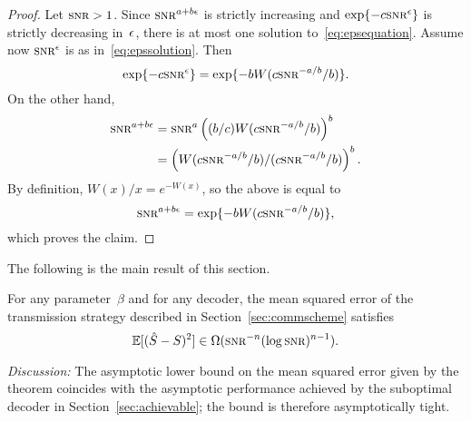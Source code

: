 \begin{proof}
  Let $\snr>1$. Since $\snr^{a+b\e}$ is strictly increasing and
  $\exp\{-c \snr^\e\}$ is strictly decreasing in~$\epsilon$, there is at most one
  solution to~\eqref{eq:epsequation}.  Assume now $\snr^\e$ is as
  in~\eqref{eq:epssolution}. Then
  \begin{equation*}
    \exp\{-c \snr^\e\} = \exp\{-b W(c \snr^{-a/b}/b)\}.
  \end{equation*}
  On the other hand,
  \begin{align*}
    \snr^{a+b\e} &= \snr^a \left( (b/c) W(c\snr^{-a/b}/b) \right)^b \\
    &= \left( W(c\snr^{-a/b}/b) / (c\snr^{-a/b}/b) \right)^b.
  \end{align*}
  By definition, $W(x)/x = e^{-W(x)}$, so the above is equal to
  \begin{equation*}
    \snr^{a+b\e} = \exp\{-bW(c \snr^{-a/b}/b)\},
  \end{equation*}
  which proves the claim.
\end{proof}

The following is the main result of this section.
\begin{theorem}
  \label{thm:scalinglb}
  For any parameter~$\beta$ and for any decoder, the mean squared error of the
  transmission strategy described in Section~\ref{sec:commscheme} satisfies
  \begin{equation*}
    \mse \in \Omega(\snr^{-n}(\log\snr)^{n-1}).
  \end{equation*}
\end{theorem}

\emph{Discussion:} The asymptotic lower bound on the mean squared error given by
the theorem coincides with the asymptotic performance achieved by the suboptimal
decoder in Section~\ref{sec:achievable}; the bound is therefore asymptotically
tight. 


